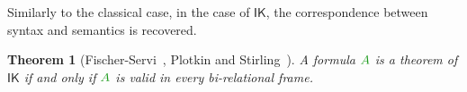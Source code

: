 \documentclass[a4paper]{article}
\theoremstyle{plain}
\newtheorem{theorem}{Theorem}[section]
\theoremstyle{definition}
\newcommand*{\IK}{\mathsf{IK}}
\newcommand*{\fm}[1]{{\color{notgreen}{#1}}}
\begin{document}
%

Similarly to the classical case, in the case of $\IK$, the correspondence between syntax and semantics is recovered.

\begin{theorem}[Fischer-Servi~\cite{fischer-servi:84}, Plotkin and Stirling~\cite{plotkin:stirling:86}]\label{thm:plotkin}
	A formula $\fm A$ is a theorem of $\IK$ if and only if $\fm A$ is valid in every bi-relational frame.
\end{theorem}
\end{document}
